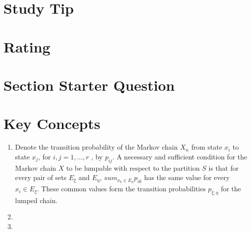 \documentclass[12pt]{article}
\begin{document}
\myheader
\mytitle

\hr

\sectiontitle{}

\hr

\usefirefox

\hr

\section*{Study Tip}

\hr

\section*{Rating} %

\hr

\section*{Section Starter Question}

\hr

\section*{Key Concepts}

\begin{enumerate}
  \item Denote the transition probability
of the Markov chain $X_n$ from state $x_i$ to state $x_j$, for \( i, j
= 1, \dots,  r\) , by \( p_{ij} \).  A 
necessary and sufficient condition for the Markov chain $X$ to be lumpable
with respect to the partition $S$ is that for every pair of sets
$E_{\xi}$ and $E_{\eta}$, \( sum_{x_k \in E_{\eta}} p_{ik} \) has the
same value for every \(x_i \in E_{\xi} \). These common values form
the transition probabilities $p_{\xi, \eta}$ for the lumped chain.

  \item 
  \item 
\end{enumerate}
\end{document}
